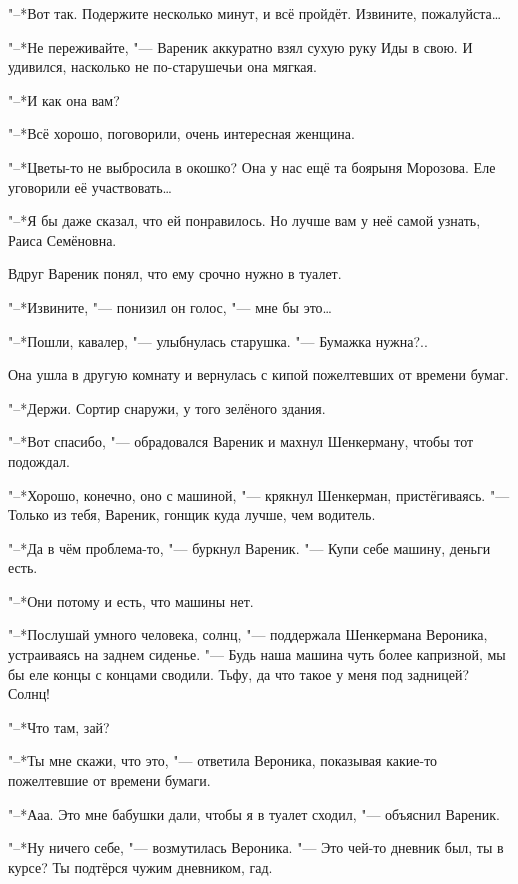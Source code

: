 "--*Вот так.
Подержите несколько минут, и всё пройдёт.
Извините, пожалуйста\ldots{}

"--*Не переживайте, "--- Вареник аккуратно взял сухую руку Иды в свою.
И удивился, насколько не по-старушечьи она мягкая.

\textspace

"--*И как она вам?

"--*Всё хорошо, поговорили, очень интересная женщина.

"--*Цветы-то не выбросила в окошко?
Она у нас ещё та боярыня Морозова.
Еле уговорили её участвовать\ldots{}

"--*Я бы даже сказал, что ей понравилось.
Но лучше вам у неё самой узнать, Раиса Семёновна.

Вдруг Вареник понял, что ему срочно нужно в туалет.

"--*Извините, "--- понизил он голос, "--- мне бы это\ldots{}

"--*Пошли, кавалер, "--- улыбнулась старушка.
"--- Бумажка нужна?..

Она ушла в другую комнату и вернулась с кипой пожелтевших от времени бумаг.

"--*Держи.
Сортир снаружи, у того зелёного здания.

"--*Вот спасибо, "--- обрадовался Вареник и махнул Шенкерману, чтобы тот подождал.

\textspace

\asterism

\textspace

"--*Хорошо, конечно, оно с машиной, "--- крякнул Шенкерман, пристёгиваясь.
"--- Только из тебя, Вареник, гонщик куда лучше, чем водитель.

"--*Да в чём проблема-то, "--- буркнул Вареник.
"--- Купи себе машину, деньги есть.

"--*Они потому и есть, что машины нет.

"--*Послушай умного человека, солнц, "--- поддержала Шенкермана Вероника, устраиваясь на заднем сиденье.
"--- Будь наша машина чуть более капризной, мы бы еле концы с концами сводили.
Тьфу, да что такое у меня под задницей?
Солнц!

"--*Что там, зай?

"--*Ты мне скажи, что это, "--- ответила Вероника, показывая какие-то пожелтевшие от времени бумаги.

"--*Ааа.
Это мне бабушки дали, чтобы я в туалет сходил, "--- объяснил Вареник.

"--*Ну ничего себе, "--- возмутилась Вероника.
"--- Это чей-то дневник был, ты в курсе?
Ты подтёрся чужим дневником, гад.

